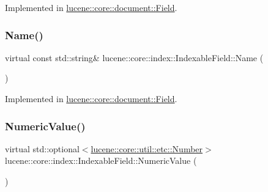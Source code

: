 Implemented in \mbox{\hyperlink{classlucene_1_1core_1_1document_1_1Field_aa3d6b7ab7cb42820491c036872190317}{lucene\+::core\+::document\+::\+Field}}.

\mbox{\label{classlucene_1_1core_1_1index_1_1IndexableField_a3eddf99b22a00458195e80429fa5ca82}} 
\subsubsection{\texorpdfstring{Name()}{Name()}}
{\footnotesize\ttfamily virtual const std\+::string\& lucene\+::core\+::index\+::\+Indexable\+Field\+::\+Name (\begin{DoxyParamCaption}{ }\end{DoxyParamCaption})\hspace{0.3cm}{\ttfamily [pure virtual]}}



Implemented in \mbox{\hyperlink{classlucene_1_1core_1_1document_1_1Field_aec97d60c8348878b7fbaed0be2e3c023}{lucene\+::core\+::document\+::\+Field}}.

\mbox{\label{classlucene_1_1core_1_1index_1_1IndexableField_ad57489328069fd1e227a0b1489159b85}} 
\subsubsection{\texorpdfstring{Numeric\+Value()}{NumericValue()}}
{\footnotesize\ttfamily virtual std\+::optional$<$\mbox{\hyperlink{classlucene_1_1core_1_1util_1_1etc_1_1Number}{lucene\+::core\+::util\+::etc\+::\+Number}}$>$ lucene\+::core\+::index\+::\+Indexable\+Field\+::\+Numeric\+Value (\begin{DoxyParamCaption}{ }\end{DoxyParamCaption})\hspace{0.3cm}{\ttfamily [pure virtual]}}



